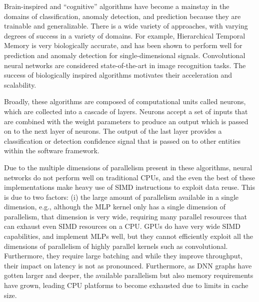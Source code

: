 Brain-inspired and ``cognitive'' algorithms have become a mainstay in the domains of classification, anomaly detection, and prediction because they are trainable and generalizable.
There is a wide variety of approaches, with varying degrees of success in a variety of domains.
For example, Hierarchical Temporal Memory is very biologically accurate, and has been shown to perform well for prediction and anomaly detection for single-dimensional signals.
Convolutional neural networks are considered state-of-the-art in image recognition tasks.
The success of biologically inspired algorithms motivates their acceleration and scalability.

Broadly, these algorithms are composed of computational units called neurons, which are collected into a cascade of layers.
Neurons accept a set of inputs that are combined with the weight parameters to produce an output which is passed on to the next layer of neurons.
The output of the last layer provides a classification or detection confidence signal that is passed on to other entities within the software framework.


Due to the multiple dimensions of parallelism present in these algorithms, neural networks do not perform well on traditional CPUs, and the even the best of these implementations make heavy use of SIMD instructions to exploit data reuse.
This is due to two factors: (i) the large amount of parallelism available in a single dimension, e.g., although the MLP kernel only has a single dimension of parallelism, that dimension is very wide, requiring many parallel resources that can exhaust even SIMD resources on a CPU.
GPUs do have very wide SIMD capabilities, and implement MLPs well, but they cannot efficiently exploit all the dimensions of parallelism of highly parallel kernels such as convolutional.
Furthermore, they require large batching and while they improve throughput, their impact on latency is not as pronounced.
Furthermore, as DNN graphs have gotten larger and deeper, the available parallelism but also memory requirements have grown, leading CPU platforms to become exhausted due to limits in cache size.

